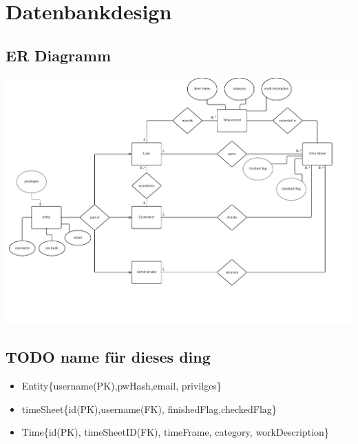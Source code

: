 \section{Datenbankdesign}

\subsection{ER Diagramm}
    \includegraphics[width=\linewidth]{"Diagramms/erDiagramm.pdf"}\\
\subsection{TODO name für dieses ding}
    \begin{itemize}
        \item Entity\{username(PK),pwHash,email, privilges\}
        \item timeSheet\{id(PK),username(FK), finishedFlag,checkedFlag\}
        \item Time\{id(PK), timeSheetID(FK), timeFrame, category, workDescription\}
    \end{itemize}